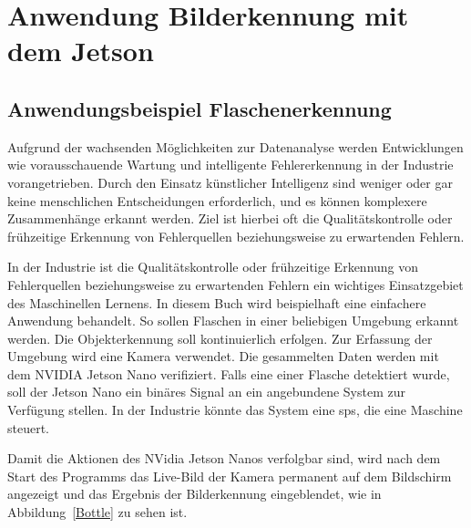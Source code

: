 %
%


\chapter{Anwendung \glqq Bilderkennung mit dem Jetson\grqq}


\section{Anwendungsbeispiel Flaschenerkennung}

Aufgrund der wachsenden Möglichkeiten zur Datenanalyse werden Entwicklungen wie
vorausschauende Wartung und intelligente Fehlererkennung in der Industrie vorangetrieben.
 Durch den Einsatz künstlicher Intelligenz sind weniger oder gar keine menschlichen Entscheidungen erforderlich, und es können komplexere Zusammenhänge erkannt werden. Ziel ist hierbei oft die Qualitätskontrolle oder frühzeitige Erkennung von Fehlerquellen beziehungsweise zu erwartenden Fehlern. 

In der Industrie ist die Qualitätskontrolle oder frühzeitige Erkennung von Fehlerquellen beziehungsweise zu erwartenden Fehlern ein wichtiges Einsatzgebiet des Maschinellen Lernens. 
 In diesem Buch wird beispielhaft eine  einfachere Anwendung behandelt. So sollen Flaschen in einer beliebigen Umgebung erkannt werden. Die Objekterkennung soll kontinuierlich erfolgen. Zur Erfassung der Umgebung  wird eine Kamera verwendet. Die gesammelten Daten werden mit dem NVIDIA Jetson Nano verifiziert. Falls eine einer Flasche detektiert wurde, soll der Jetson Nano ein binäres Signal an ein angebundene System zur Verfügung stellen. In der Industrie könnte das System eine \ac{sps}, die eine Maschine steuert. 

\bigskip

Damit die Aktionen des NVidia Jetson Nanos verfolgbar sind, wird nach dem Start des Programms das Live-Bild der Kamera permanent auf dem Bildschirm angezeigt und das Ergebnis der Bilderkennung eingeblendet, wie in Abbildung~\ref{Bottle} zu sehen ist.

